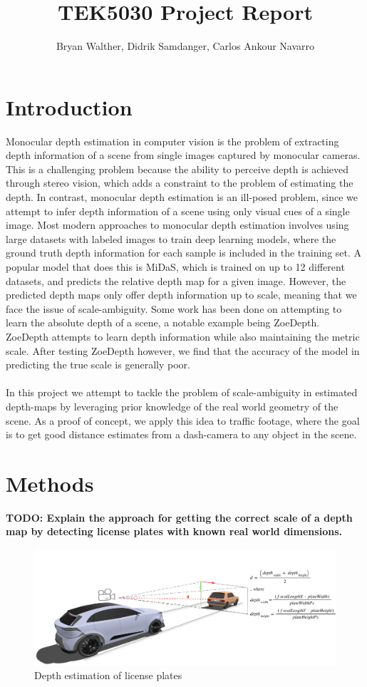 \documentclass[12pt]{article}
\title{TEK5030 Project Report}
\author{Bryan Walther, Didrik Samdanger, Carlos Ankour Navarro}
\begin{document}
\maketitle

\section{Introduction}
Monocular depth estimation in computer vision is the problem of extracting depth information of a scene from single images captured by monocular cameras.
This is a challenging problem because the ability to perceive depth is achieved through stereo vision, which adds a constraint to the problem of estimating the depth.
In contrast, monocular depth estimation is an ill-posed problem, since we attempt to infer depth information of a scene using only visual cues of a single image.
Most modern approaches to monocular depth estimation involves using large datasets with labeled images to train deep learning models, where the ground truth depth information for each sample is included in the training set.
A popular model that does this is MiDaS, which is trained on up to 12 different datasets, and predicts the relative depth map for a given image.
However, the predicted depth maps only offer depth information up to scale, meaning that we face the issue of scale-ambiguity.
Some work has been done on attempting to learn the absolute depth of a scene, a notable example being ZoeDepth.
ZoeDepth attempts to learn depth information while also maintaining the metric scale.
After testing ZoeDepth however, we find that the accuracy of the model in predicting the true scale is generally poor.
\\ \\
In this project we attempt to tackle the problem of scale-ambiguity in estimated depth-maps by leveraging prior knowledge of the real world geometry of the scene.
As a proof of concept, we apply this idea to traffic footage, where the goal is to get good distance estimates from a dash-camera to any object in the scene.

\section{Methods}
\textbf{TODO: Explain the approach for getting the correct scale of a depth map by detecting license plates with known real world dimensions.}
\begin{figure}[H]
    \centering
    \includegraphics[width=1.0\textwidth]{img/illustration.png}
    \caption{Depth estimation of license plates }
    \label{fig:illustration}
\end{figure}
\end{document}
